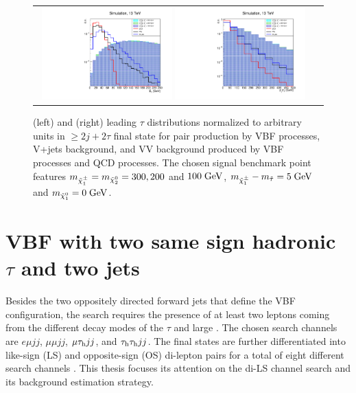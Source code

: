 \begin{figure}[tbh!]
	\centering
	\begin{tabular}{cc}
		\includegraphics[width=0.48\textwidth]{analysis/pics/h_met_prospects13tev.pdf}
		\includegraphics[width=0.48\textwidth]{analysis/pics/h_tau1pt_prospects13tev.pdf} 		
	\end{tabular}
	\caption{(left) \met and (right) leading \ensuremath{\tau} \pt distributions normalized to arbitrary units in \ensuremath{\geq 2j + 2\tau} final state for \charginopm \charginopm pair production by VBF processes, V+jets background, and VV background produced by VBF processes and QCD processes. The chosen signal benchmark point features \ensuremath{m_{\charginopm} = m_{\neutralinotwo} =300, 200} and \ensuremath{100\gev}, \ensuremath{m_{\charginopm} - m_{\tilde{\tau}} = 5\gev} and \ensuremath{m_{\neutralinoone} = 0\gev}.}
	\label{fig:VBF_met_pttau}
\end{figure}


\section{VBF with two same sign hadronic $\tau$ and two jets}

Besides the two oppositely directed forward jets that define the VBF configuration, the search requires the presence of at least two leptons coming from the different decay modes of the $\tau$ and large \met. The chosen search channels are $e\mu jj$, $\mu\mu jj$, $\mu\tau_{\text{h}} jj$, and $\tau_{\text{h}}\tau_{\text{h}} jj$. The final states are further differentiated into like-sign (LS) and opposite-sign (OS) di-lepton pairs for a total of eight different search channels \cite{Khachatryan:2015kxa}. This thesis focuses its attention on the di-\hadtau LS channel search and its background estimation strategy. 


